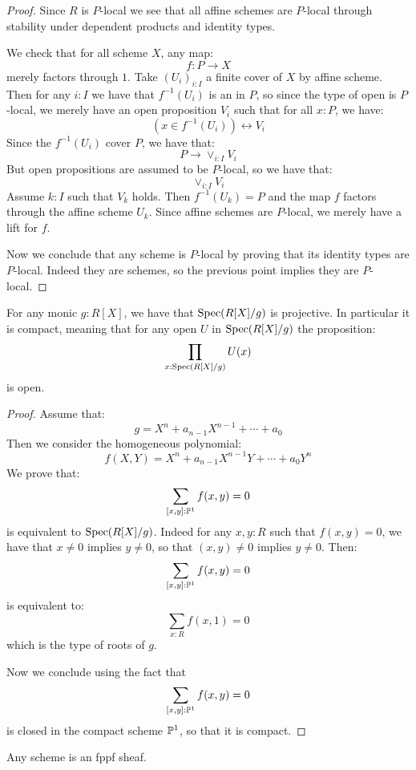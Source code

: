 \begin{proof}
Since $R$ is $P$-local we see that all affine schemes are $P$-local through stability under dependent products and identity types.

We check that for all scheme $X$, any map:
\[f:P\to X\]
merely factors through $1$. Take $(U_i)_{i:I}$ a finite cover of $X$ by affine scheme. Then for any $i:I$ we have that $f^{-1}(U_i)$ is an in $P$, so since the type of open is $P$-local, we merely have an open proposition $V_i$ such that for all $x:P$, we have:
\[(x\in f^{-1}(U_i) )\leftrightarrow V_i\]
Since the $f^{-1}(U_i)$ cover $P$, we have that:
\[P\to \lor_{i:I} V_i\]
But open propositions are assumed to be $P$-local, so we have that:
\[ \lor_{i:I} V_i\]
Assume $k:I$ such that $V_k$ holds. Then $f^{-1}(U_k) = P$ and the map $f$ factors through the affine scheme $U_k$. Since affine schemes are $P$-local, we merely have a lift for $f$.

Now we conclude that any scheme is $P$-local by proving that its identity types are $P$-local. Indeed they are schemes, so the previous point implies they are $P$-local.
\end{proof}

\begin{lemma}\label{roots-monic-proper}
For any monic $g:R[X]$, we have that $\operatorname{Spec}(R[X]/g)$ is projective. In particular it is compact, meaning that for any open $U$ in $\operatorname{Spec}(R[X]/g)$ the proposition:
\[\prod_{x:\operatorname{Spec}(R[X]/g)}U(x)\]
is open.
\end{lemma}

\begin{proof}
Assume that:
\[g=X^n+a_{n-1}X^{n-1}+\cdots+a_0\]
Then we consider the homogeneous polynomial:
\[f(X,Y) = X^n + a_{n-1}X^{n-1}Y+\cdots+a_0Y^n\]
We prove that:
\[\sum_{[x,y]:\mathbb{P}^1}f(x,y) = 0\]
is equivalent to $\operatorname{Spec}(R[X]/g)$. Indeed for any $x,y:R$ such that $f(x,y)=0$, we have that $x\not=0$ implies $y\not=0$, so that $(x,y)\not=0$ implies $y\not=0$. Then:
\[\sum_{[x,y]:\mathbb{P}^1}f(x,y) = 0\]
is equivalent to:
\[\sum_{x:R} f(x,1)=0\]
which is the type of roots of $g$. 

Now we conclude using the fact that 
\[\sum_{[x,y]:\mathbb{P}^1}f(x,y) = 0\]
is closed in the compact scheme $\mathbb{P}^1$, so that it is compact.
\end{proof}

\begin{proposition}
Any scheme is an fppf sheaf.
\end{proposition}

